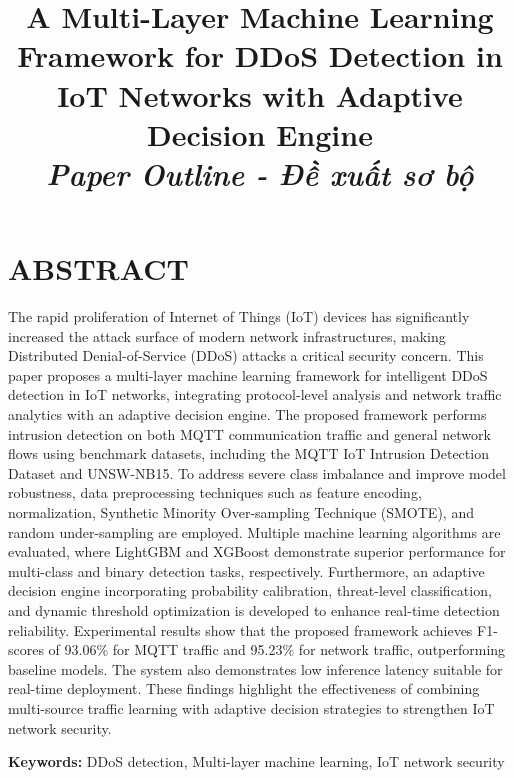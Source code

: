 \documentclass[conference]{IEEEtran}
\begin{document}
\title{A Multi-Layer Machine Learning Framework for DDoS Detection in IoT Networks with Adaptive Decision Engine\\
{\large \textit{Paper Outline - Đề xuất sơ bộ}}}

\author{
}

\maketitle

\section{ABSTRACT}
The rapid proliferation of Internet of Things (IoT) devices has significantly increased the attack surface of modern network infrastructures, making Distributed Denial-of-Service (DDoS) attacks a critical security concern. This paper proposes a multi-layer machine learning framework for intelligent DDoS detection in IoT networks, integrating protocol-level analysis and network traffic analytics with an adaptive decision engine. The proposed framework performs intrusion detection on both MQTT communication traffic and general network flows using benchmark datasets, including the MQTT IoT Intrusion Detection Dataset and UNSW-NB15. To address severe class imbalance and improve model robustness, data preprocessing techniques such as feature encoding, normalization, Synthetic Minority Over-sampling Technique (SMOTE), and random under-sampling are employed. Multiple machine learning algorithms are evaluated, where LightGBM and XGBoost demonstrate superior performance for multi-class and binary detection tasks, respectively. Furthermore, an adaptive decision engine incorporating probability calibration, threat-level classification, and dynamic threshold optimization is developed to enhance real-time detection reliability. Experimental results show that the proposed framework achieves F1-scores of 93.06\% for MQTT traffic and 95.23\% for network traffic, outperforming baseline models. The system also demonstrates low inference latency suitable for real-time deployment. These findings highlight the effectiveness of combining multi-source traffic learning with adaptive decision strategies to strengthen IoT network security.

\textbf{Keywords:} DDoS detection, Multi-layer machine learning, IoT network security
\end{document}
